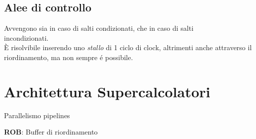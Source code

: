 \documentclass[a4paper,10pt]{article}
\begin{document}
\subsection{Alee di controllo}
Avvengono sia in caso di salti condizionati, che in caso di salti\\ incondizionati.
\\
È risolvibile inserendo uno \textit{stallo} di 1 ciclo di clock, altrimenti anche attraverso il riordinamento, ma non sempre é possibile.


\section{Architettura Supercalcolatori}
Parallelismo pipelines

\textbf{ROB}: Buffer di riordinamento





\end{document}
